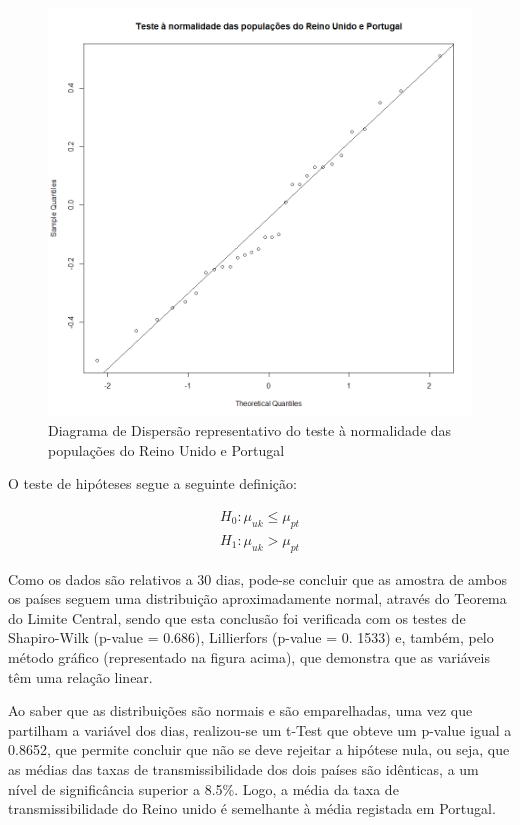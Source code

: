 \documentclass[conference]{IEEEtran}
\begin{document}
\begin{figure}[htbp]
\centerline{\includegraphics[width=0.95\columnwidth]{images/02.a.png}}
\caption{Diagrama de Dispersão representativo do teste à normalidade das populações do Reino Unido e Portugal}
\label{fig}
\end{figure}

O teste de hipóteses segue a seguinte definição:

\begin{equation}
  \begin{array}{l}
    H_{0}:\mu _{uk}\leq \mu _{pt} \\
   	H_{1}:\mu _{uk}> \mu _{pt}
  \end{array}
\end{equation}

Como os dados são relativos a 30 dias, pode-se concluir que as amostra de ambos os países seguem uma distribuição aproximadamente normal, através do Teorema do Limite Central, sendo que esta conclusão foi verificada com os testes de Shapiro-Wilk (p-value = 0.686), Lillierfors (p-value = 0. 1533) e, também, pelo método gráfico (representado na figura acima), que demonstra que as variáveis têm uma relação linear. 

Ao saber que as distribuições são normais e são emparelhadas, uma vez que partilham a variável dos dias, realizou-se um t-Test que obteve um p-value igual a 0.8652, que permite concluir que não se deve rejeitar a hipótese nula, ou seja, que as médias das taxas de transmissibilidade dos dois países são idênticas, a um nível de significância superior a 8.5\%. Logo, a média da taxa de transmissibilidade do Reino unido é semelhante à média registada em Portugal.
\end{document}
